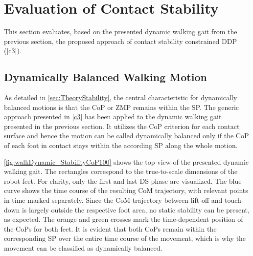 

\section{Evaluation of Contact Stability}\label{sec:BipedEvaluation}
This section evaluates, based on the presented dynamic walking gait from the previous section, the proposed approach of contact stability constrained DDP (\cref{c3}).

\subsection{Dynamically Balanced Walking Motion}
As detailed in \cref{sec:TheoryStability}, the central characteristic for dynamically balanced motions is that the \gls{CoP} or \gls{ZMP} remains within the \gls{SP}. The generic approach presented in \cref{c3} has been applied to the dynamic walking gait presented in the previous section. It utilizes the \gls{CoP} criterion for each contact surface and hence the motion can be called dynamically balanced only if the \gls{CoP} of each foot in contact stays within the according \gls{SP} along the whole motion. 

\cref{fig:walkDynamic_StabilityCoP100} shows the top view of the presented dynamic walking  gait. The rectangles correspond to the true-to-scale dimensions of the robot feet. For clarity, only the first and last \gls{DS} phase are visualized.  
The blue curve shows the time course of the resulting \gls{CoM} trajectory, with relevant points in time marked separately. Since the \gls{CoM} trajectory between lift-off and touch-down is largely outside the respective foot area, no static stability can be present, as expected. 
The orange and green crosses mark the time-dependent position of the \gls{CoP}s for both feet. It is evident that both \gls{CoP}s remain within the corresponding SP over the entire time course of the movement, which is why the movement can be classified as dynamically balanced. 

